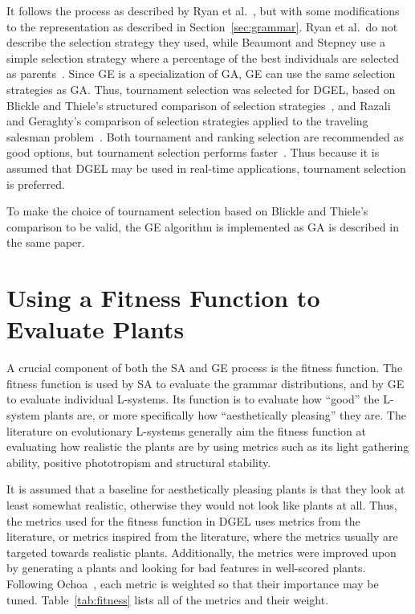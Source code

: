 It follows the process as described by Ryan et al.~\cite{1998Ryan}, but with some modifications to the representation as described in Section~\ref{sec:grammar}.
Ryan et al.\ do not describe the selection strategy they used, while Beaumont and Stepney use a simple selection strategy where a percentage of the best individuals are selected as parents~\cite{2009Beaumont}.
Since GE is a specialization of GA, GE can use the same selection strategies as GA.
Thus, tournament selection was selected for DGEL, based on Blickle and Thiele's structured comparison of selection strategies~\cite{1995Blickle}, and Razali and Geraghty's comparison of selection strategies applied to the traveling salesman problem~\cite{2011Razali}.
Both tournament and ranking selection are recommended as good options, but tournament selection performs faster~\cite{1995Blickle}.
Thus because it is assumed that DGEL may be used in real-time applications, tournament selection is preferred.

To make the choice of tournament selection based on Blickle and Thiele's comparison to be valid, the GE algorithm is implemented as GA is described in the same paper.

\section{Using a Fitness Function to Evaluate Plants}
A crucial component of both the SA and GE process is the fitness function.
The fitness function is used by SA to evaluate the grammar distributions, and by GE to evaluate individual L-systems.
Its function is to evaluate how ``good'' the L-system plants are, or more specifically how ``aesthetically pleasing'' they are.
The literature on evolutionary L-systems generally aim the fitness function at evaluating how realistic the plants are by using metrics such as its light gathering ability, positive phototropism and structural stability.

It is assumed that a baseline for aesthetically pleasing plants is that they look at least somewhat realistic, otherwise they would not look like plants at all.
Thus, the metrics used for the fitness function in DGEL uses metrics from the literature, or metrics inspired from the literature, where the metrics usually are targeted towards realistic plants.
Additionally, the metrics were improved upon by generating a plants and looking for bad features in well-scored plants.
Following Ochoa~\cite{1998Ochoa}, each metric is weighted so that their importance may be tuned.
Table~\ref{tab:fitness} lists all of the metrics and their weight.

